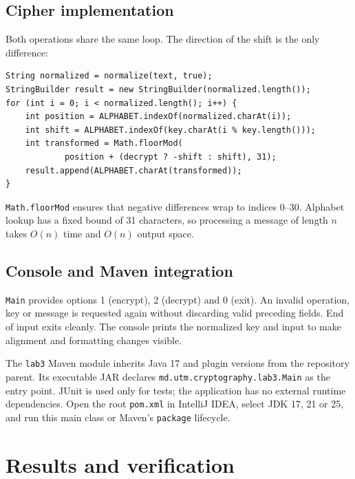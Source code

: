 \documentclass{utmreport}
\begin{document}
\section{Cipher implementation}
Both operations share the same loop. The direction of the shift is the only difference:
\begin{lstlisting}
String normalized = normalize(text, true);
StringBuilder result = new StringBuilder(normalized.length());
for (int i = 0; i < normalized.length(); i++) {
    int position = ALPHABET.indexOf(normalized.charAt(i));
    int shift = ALPHABET.indexOf(key.charAt(i % key.length()));
    int transformed = Math.floorMod(
            position + (decrypt ? -shift : shift), 31);
    result.append(ALPHABET.charAt(transformed));
}
\end{lstlisting}
\texttt{Math.floorMod} ensures that negative differences wrap to indices 0--30. Alphabet lookup has a fixed bound of 31 characters, so processing a message of length $n$ takes $O(n)$ time and $O(n)$ output space.

\section{Console and Maven integration}
\texttt{Main} provides options 1 (encrypt), 2 (decrypt) and 0 (exit). An invalid operation, key or message is requested again without discarding valid preceding fields. End of input exits cleanly. The console prints the normalized key and input to make alignment and formatting changes visible.

The \texttt{lab3} Maven module inherits Java 17 and plugin versions from the repository parent. Its executable JAR declares \texttt{md.utm.cryptography.lab3.Main} as the entry point. JUnit is used only for tests; the application has no external runtime dependencies. Open the root \texttt{pom.xml} in IntelliJ IDEA, select JDK 17, 21 or 25, and run this main class or Maven's \texttt{package} lifecycle.

\chapter{Results and verification}
\end{document}

